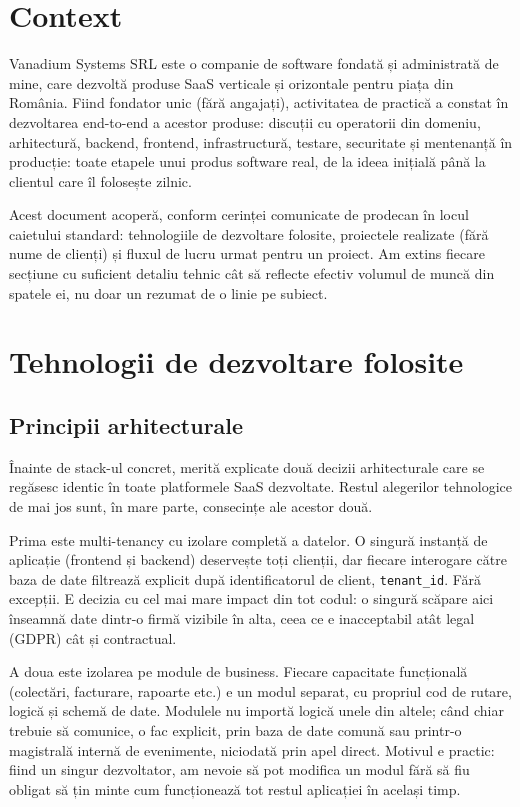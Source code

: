\documentclass[11pt, a4paper]{article}
\begin{document}
\section*{Context}

Vanadium Systems SRL este o companie de software fondată și administrată de mine, care
dezvoltă produse SaaS verticale și orizontale pentru piața din România. Fiind fondator unic
(fără angajați), activitatea de practică a constat în dezvoltarea end-to-end a acestor produse:
discuții cu operatorii din domeniu, arhitectură, backend, frontend, infrastructură, testare,
securitate și mentenanță în producție: toate etapele unui produs software real, de la ideea
inițială până la clientul care îl folosește zilnic.

Acest document acoperă, conform cerinței comunicate de prodecan în locul caietului standard:
tehnologiile de dezvoltare folosite, proiectele realizate (fără nume de clienți) și fluxul de
lucru urmat pentru un proiect. Am extins fiecare secțiune cu suficient detaliu tehnic cât să
reflecte efectiv volumul de muncă din spatele ei, nu doar un rezumat de o linie pe subiect.


\section{Tehnologii de dezvoltare folosite}

\subsection{Principii arhitecturale}

Înainte de stack-ul concret, merită explicate două decizii arhitecturale care se regăsesc
identic în toate platformele SaaS dezvoltate. Restul alegerilor tehnologice de mai jos sunt,
în mare parte, consecințe ale acestor două.

Prima este multi-tenancy cu izolare completă a datelor. O singură instanță de aplicație
(frontend și backend) deservește toți clienții, dar fiecare interogare către baza de date
filtrează explicit după identificatorul de client, \texttt{tenant\_id}. Fără excepții. E decizia
cu cel mai mare impact din tot codul: o singură scăpare aici înseamnă date dintr-o firmă vizibile
în alta, ceea ce e inacceptabil atât legal (GDPR) cât și contractual.

A doua este izolarea pe module de business. Fiecare capacitate funcțională (colectări, facturare,
rapoarte etc.) e un modul separat, cu propriul cod de rutare, logică și schemă de date. Modulele
nu importă logică unele din altele; când chiar trebuie să comunice, o fac explicit, prin baza de
date comună sau printr-o magistrală internă de evenimente, niciodată prin apel direct. Motivul e
practic: fiind un singur dezvoltator, am nevoie să pot modifica un modul fără să fiu obligat să
țin minte cum funcționează tot restul aplicației în același timp.
\end{document}
